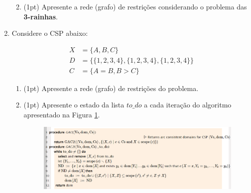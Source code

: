 \documentclass{article}
\begin{document}
\begin{enumerate}
\begin{enumerate}
    
    \vspace{1.5cm}
        \item (1pt) Apresente a rede (grafo) de restrições considerando o problema das \textbf{3-rainhas}.
        
        
    \end{enumerate}
    
    \pagebreak    
    \item Considere o CSP abaixo:

        \begin{align*}
        X &= \{A,B,C\} \\
        D &= \{\{1,2,3,4\},\{1,2,3,4\},\{1,2,3,4\} \}\\
        C &= \{ A = B, B > C \}    
        \end{align*}

    \begin{enumerate}
        \item (1pt) Apresente a rede (grafo) de restrições do problema.  
        
        
        \item (1pt) Apresente o estado da lista $to\_do$ a cada iteração do algoritmo apresentado na Figura \ref{fig:GAC}. 
            \begin{figure}[!ht]
            \centering
            \includegraphics[width=1\textwidth]{gac.png}
            \label{fig:GAC}
            \end{figure}
            

\end{enumerate}
\end{enumerate}
\end{document}
